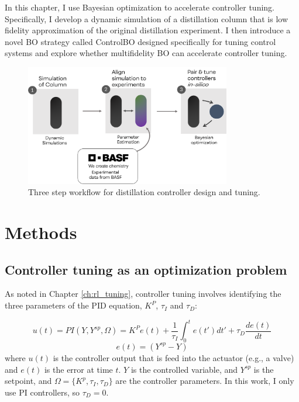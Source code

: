 In this chapter, I use Bayesian optimization to accelerate controller tuning. Specifically, I develop a dynamic simulation of a distillation column that is low fidelity approximation of the original distillation experiment. I then introduce a novel BO strategy called ControlBO designed specifically for tuning control systems and explore whether multifidelity BO can accelerate controller tuning.

\begin{figure}
    \centering
    \includegraphics[width=0.8\textwidth]{gfx/Chapter06/tuning_workflow.png}
    \caption{Three step workflow for distillation controller design and tuning.}
    \label{fig:tuning_workflow}
\end{figure}

\section{Methods}

\subsection{Controller tuning as an optimization problem}

As noted in Chapter \ref{ch:rl_tuning}, controller tuning involves identifying the three parameters of the PID equation, $K^P$, $\tau_I$ and $\tau_D$:

\begin{equation}
    u(t) = PI(Y, Y^{sp}, \Omega) =  K^P e(t) + \frac{1}{\tau_I}\int_0^t e(t')dt' + \tau_D \frac{de(t)}{dt}
\end{equation}
\begin{equation}
    e(t) = (Y^{sp} - Y)
\end{equation}
where $u(t)$ is the controller output that is feed into the actuator (e.g., a valve) and $e(t)$ is the error at time $t$. $Y$ is the controlled variable, and $Y^{sp}$ is the setpoint, and $\Omega=\{K^p, \tau_I, \tau_D \}$ are the controller parameters. In this work, I only use PI controllers, so $\tau_D=0$.

